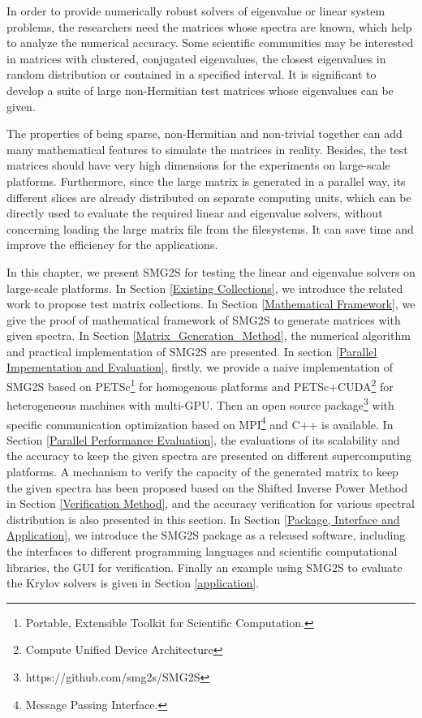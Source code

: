 In order to provide numerically robust solvers of eigenvalue or linear system problems, the researchers need the matrices whose spectra are known, which help to analyze the numerical accuracy. Some scientific communities may be interested in matrices with clustered, conjugated eigenvalues, the closest eigenvalues in random distribution or contained in a specified interval. It is significant to develop a suite of large non-Hermitian test matrices whose eigenvalues can be given.

The properties of being sparse, non-Hermitian and non-trivial together can add many mathematical features to simulate the matrices in reality. Besides, the test matrices should have very high dimensions for the experiments on large-scale platforms. Furthermore, since the large matrix is generated in a parallel way, its different slices are already distributed on separate computing units, which can be directly used to evaluate the required linear and eigenvalue solvers, without concerning loading the large matrix file from the filesystems. It can save time and improve the efficiency for the applications.

In this chapter, we present SMG2S for testing the linear and eigenvalue solvers on large-scale platforms. In Section \ref{Existing Collections}, we introduce the related work to propose test matrix collections. In Section \ref{Mathematical Framework}, we give the proof of mathematical framework of SMG2S to generate matrices with given spectra. In Section \ref{Matrix_Generation_Method}, the numerical algorithm and practical implementation of SMG2S are presented. In section \ref{Parallel Impementation and Evaluation}, firstly, we provide a naive implementation of SMG2S based on PETSc\footnote{Portable, Extensible Toolkit for Scientific Computation.} for homogenous platforms and PETSc+CUDA\footnote{Compute Unified Device Architecture} for heterogeneous machines with multi-GPU. Then an open source package\footnote{https://github.com/smg2s/SMG2S} with specific communication optimization based on MPI\footnote{Message Passing Interface.} and C++ is available.  In Section \ref{Parallel Performance Evaluation}, the evaluations of its scalability and the accuracy to keep the given spectra are presented on different supercomputing platforms.  A mechanism to verify the capacity of the generated matrix to keep the given spectra has been proposed based on the Shifted Inverse Power Method in Section \ref{Verification Method}, and the accuracy verification for various spectral distribution is also presented in this section. In Section \ref{Package, Interface and Application}, we introduce the SMG2S package as a released software, including the interfaces to different programming languages and scientific computational libraries, the GUI for verification. Finally an example using SMG2S to evaluate the Krylov solvers is given in Section \ref{application}. 

